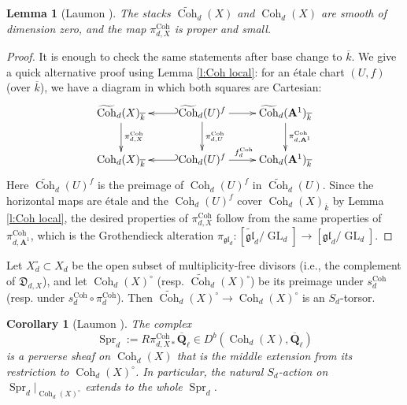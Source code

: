 \documentclass[reqno]{amsart}
\numberwithin{equation}{section}
\newcommand{\wt}[1]{\widetilde{#1}}
\newcommand{\Q}{\mathbf{Q}}
\newcommand{\A}{\mathbf{A}}
\DeclareMathOperator{\GL}{GL}
\DeclareMathOperator{\Coh}{Coh}
\DeclareMathOperator{\Spr}{Spr}
\newcommand{\Qlbar}{\overline{\Q}_\ell}
\newcommand{\ov}{\overline}
\renewcommand\c{\circ}
\newcommand\gl{\mathfrak{gl}}
\newcommand\frD{\mathfrak{D}}
\newtheorem{lemma}[thm]{Lemma}
\newtheorem{cor}[thm]{Corollary}
\theoremstyle{remark}
\numberwithin{equation}{section}
\begin{document}
\begin{lemma}[Laumon {\cite[Theorem 3.3.1]{Lau87}}]\label{lem: Laumon small} The stacks $\wt\Coh_{d}(X)$ and $\Coh_{d}(X)$ are smooth of dimension zero, and the map $\pi^{\Coh}_{d,X}$ is proper and small.
\end{lemma}
\begin{proof} It is enough to check the same statements after base change to $\ov k$. We give a quick alternative proof using Lemma \ref{l:Coh local}: for an \'etale chart $(U,f)$ (over $\ov k$), we have a diagram in which both squares are Cartesian:
\begin{equation*}
\xymatrix{     \wt\Coh_{d}(X)_{\ov k}   \ar[d]^{\pi^{\Coh}_{d,X}} &  \wt\Coh_{d}(U)^{f}   \ar[d]^{\pi^{\Coh}_{d,U}} \ar[r] \ar@{_{(}->}[l] & \wt\Coh_{d}(\A^{1})_{\ov k}   \ar[d]^{\pi^{\Coh}_{d,\A^{1}}} \\
\Coh_{d}(X)_{\ov k}   & \Coh_{d}(U)^{f} \ar[r]^{f^{\Coh}_{d}} \ar@{_{(}->}[l]  & \Coh_{d}(\A^{1})_{\ov k}}
\end{equation*}
Here $\wt\Coh_{d}(U)^{f}$ is the preimage of $\Coh_{d}(U)^{f}$ in $\wt\Coh_{d}(U)$. Since the horizontal maps are \'etale and the $\Coh_{d}(U)^{f}$ cover $\Coh_{d}(X)_{\ov k}$ by Lemma \ref{l:Coh local}, the desired properties of $\pi^{\Coh}_{d,X}$ follow from the same properties of $\pi^{\Coh}_{d,\A^{1}}$, which is the Grothendieck alteration $\pi_{\gl_{d}}: [\wt\gl_{d}/\GL_{d}]\to [\gl_{d}/\GL_{d}]$.
\end{proof}

Let $X_{d}^{\c}\subset X_{d}$ be the open subset of multiplicity-free divisors (i.e., the complement of $\frD_{d,X}$), and let $\Coh_{d}(X)^{\c}$ (resp. $\wt\Coh_{d}(X)^{\c}$) be its  preimage under $s^{\Coh}_{d}$ (resp. under $s^{\Coh}_{d}\c\pi_{d}^{\Coh}$). Then $\wt\Coh_{d}(X)^{\c}\to \Coh_{d}(X)^{\c}$ is an $S_{d}$-torsor. 

\begin{cor}[Laumon {\cite[p.320]{Lau87}}]\label{c:Coh Spr} The complex 
\begin{equation*}
\Spr_{d}:=R\pi^{\Coh}_{d,X*}\Qlbar\in D^{b}(\Coh_{d}(X), \Qlbar)
\end{equation*}
is a perverse sheaf on $\Coh_{d}(X)$ that is the middle extension from its restriction to $\Coh_{d}(X)^{\c}$. In particular, the natural $S_{d}$-action on $\Spr_d|_{\Coh_{d}(X)^{\c}}$ extends to the whole $\Spr_{d}$.
\end{cor}
\end{document}

